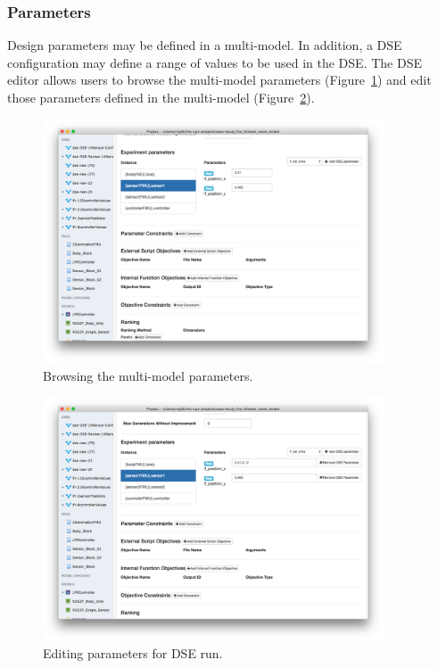 \subsubsection{Parameters}\label{sec:dse:app:parameters}

Design parameters may be defined in a multi-model. In addition, a DSE configuration may define a range of values to be used in the DSE. The DSE editor allows users to browse the multi-model parameters (Figure~\ref{fig:dse:edit:app-param}) and edit those parameters defined in the multi-model (Figure~\ref{fig:dse:edit:app-param-edit}). 
%
%
\begin{figure}[ht]
	\centering
	\includegraphics[width=0.9\textwidth]{figures/dse/app-param}
	\caption{Browsing the multi-model parameters.}\label{fig:dse:edit:app-param}
\end{figure}
%
%
%
\begin{figure}[ht]
	\centering
	\includegraphics[width=0.9\textwidth]{figures/dse/app-param-edit}
	\caption{Editing parameters for DSE run.}\label{fig:dse:edit:app-param-edit}
\end{figure}
%
%
%

